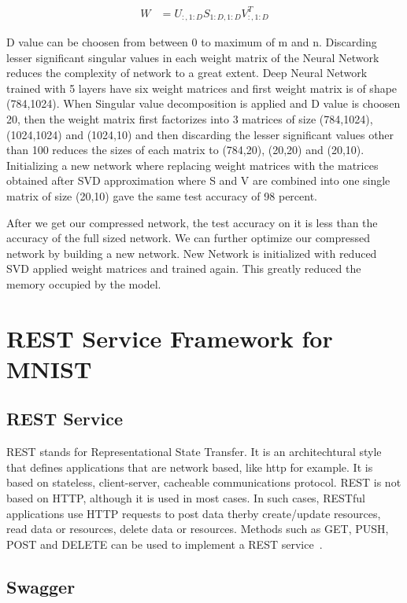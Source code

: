  \begin{align*}
 W& = U_{:,1:D}S_{1:D,1:D}V_{:,1:D}^{T}
 \end{align*}

 D value can be choosen from between 0 to maximum of m and n. Discarding 
 lesser significant singular values in each weight matrix of the Neural Network 
 reduces the complexity of network to a great extent. Deep Neural Network 
 trained with 5 layers have six weight matrices and first weight matrix is of 
 shape (784,1024). When Singular value decomposition is applied and D value is 
 choosen 20, then the weight matrix first factorizes into 3 matrices of size 
 (784,1024), (1024,1024) and (1024,10) and then discarding the lesser 
 significant values other than 100 reduces the sizes of each matrix to (784,20),
 (20,20) and (20,10). Initializing a new network where replacing weight matrices
 with the matrices obtained after SVD approximation where S and V are combined 
 into one single matrix of size (20,10) gave the same test accuracy of 98 
 percent. 

 After we get our compressed network, the test accuracy on it is less than the 
 accuracy of the full sized network. We can further optimize our compressed 
 network by building a new network. New Network is initialized with reduced SVD 
 applied weight matrices and trained again. This greatly reduced the memory 
 occupied by the model.

\section{REST Service Framework for MNIST}

\subsection{REST Service}

REST stands for Representational State Transfer. It is an architechtural style
that defines applications that are network based, like http for example.  It is
based on stateless, client-server, cacheable communications protocol. REST is
not based on HTTP, although it is used in most cases. In such cases, RESTful
applications use HTTP requests to post data therby create/update resources, read
data or resources, delete data or resources. Methods such as GET, PUSH, POST and
DELETE can be used to implement a REST service~\cite{hid-sp18-401-Rest-Service}.


\subsection{Swagger}

